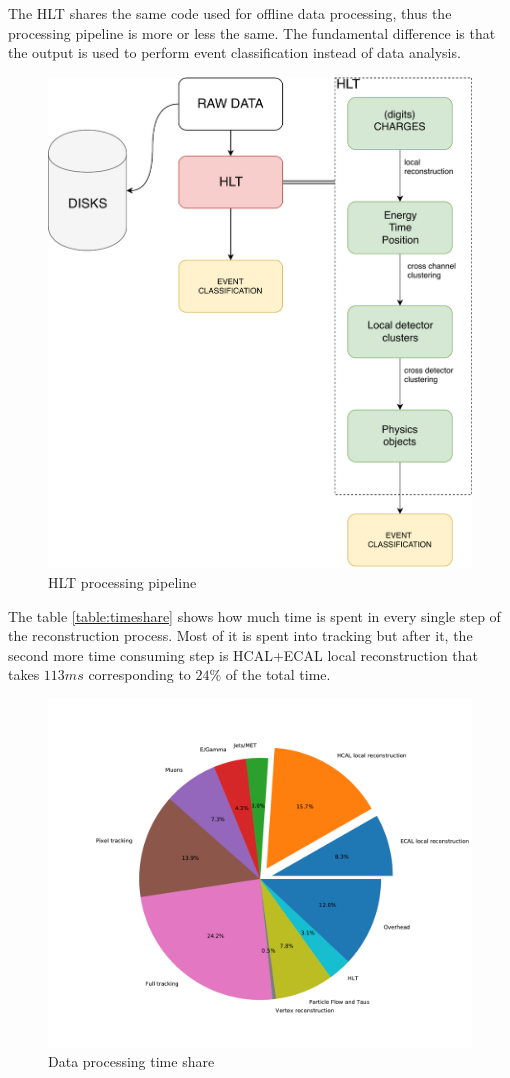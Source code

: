 The HLT shares the same code used for offline data processing, thus the processing pipeline is more or less the same. The fundamental difference is that the output is used to perform event classification instead of data analysis. 
\begin{figure}[ht]
  \centering
  \caption{HLT processing pipeline}
  \label{img:hlt}
  \includegraphics[width=.75\textwidth]{img/hlt}
\end{figure}
The table \ref{table:timeshare} shows how much time is spent in every single step of the reconstruction process. Most of it is spent into tracking but after it, the second more time consuming step is HCAL+ECAL local reconstruction that takes $113 ms$ corresponding to $24\%$ of the total time.
\begin{figure}[ht]
  \caption{Data processing time share}
  \label{img:hlt}
  \includegraphics[width=\textwidth]{img/timeshare}
\end{figure}
